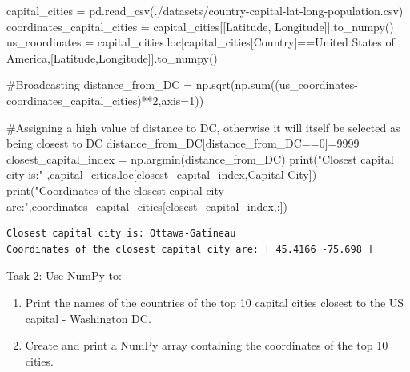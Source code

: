 \documentclass[
  letterpaper,
  DIV=11,
  numbers=noendperiod]{scrreprt}
\newenvironment{Shaded}{\begin{snugshade}}{\end{snugshade}}
\newcommand{\BuiltInTok}[1]{\textcolor[rgb]{0.00,0.23,0.31}{#1}}
\newcommand{\CommentTok}[1]{\textcolor[rgb]{0.37,0.37,0.37}{#1}}
\newcommand{\DecValTok}[1]{\textcolor[rgb]{0.68,0.00,0.00}{#1}}
\newcommand{\NormalTok}[1]{\textcolor[rgb]{0.00,0.23,0.31}{#1}}
\newcommand{\OperatorTok}[1]{\textcolor[rgb]{0.37,0.37,0.37}{#1}}
\newcommand{\StringTok}[1]{\textcolor[rgb]{0.13,0.47,0.30}{#1}}
\begin{document}
\begin{Shaded}
\begin{Highlighting}[]

\NormalTok{capital\_cities }\OperatorTok{=}\NormalTok{ pd.read\_csv(}\StringTok{\textquotesingle{}./datasets/country{-}capital{-}lat{-}long{-}population.csv\textquotesingle{}}\NormalTok{)}
\NormalTok{coordinates\_capital\_cities }\OperatorTok{=}\NormalTok{ capital\_cities[[}\StringTok{\textquotesingle{}Latitude\textquotesingle{}}\NormalTok{, }\StringTok{\textquotesingle{}Longitude\textquotesingle{}}\NormalTok{]].to\_numpy()}
\NormalTok{us\_coordinates }\OperatorTok{=}\NormalTok{ capital\_cities.loc[capital\_cities[}\StringTok{\textquotesingle{}Country\textquotesingle{}}\NormalTok{]}\OperatorTok{==}\StringTok{\textquotesingle{}United States of America\textquotesingle{}}\NormalTok{,[}\StringTok{\textquotesingle{}Latitude\textquotesingle{}}\NormalTok{,}\StringTok{\textquotesingle{}Longitude\textquotesingle{}}\NormalTok{]].to\_numpy()}

\CommentTok{\#Broadcasting}
\NormalTok{distance\_from\_DC }\OperatorTok{=}\NormalTok{ np.sqrt(np.}\BuiltInTok{sum}\NormalTok{((us\_coordinates}\OperatorTok{{-}}\NormalTok{coordinates\_capital\_cities)}\OperatorTok{**}\DecValTok{2}\NormalTok{,axis}\OperatorTok{=}\DecValTok{1}\NormalTok{))}

\CommentTok{\#Assigning a high value of distance to DC, otherwise it will itself be selected as being closest to DC}
\NormalTok{distance\_from\_DC[distance\_from\_DC}\OperatorTok{==}\DecValTok{0}\NormalTok{]}\OperatorTok{=}\DecValTok{9999}
\NormalTok{closest\_capital\_index }\OperatorTok{=}\NormalTok{ np.argmin(distance\_from\_DC)}
\BuiltInTok{print}\NormalTok{(}\StringTok{"Closest capital city is:"}\NormalTok{ ,capital\_cities.loc[closest\_capital\_index,}\StringTok{\textquotesingle{}Capital City\textquotesingle{}}\NormalTok{])}
\BuiltInTok{print}\NormalTok{(}\StringTok{"Coordinates of the closest capital city are:"}\NormalTok{,coordinates\_capital\_cities[closest\_capital\_index,:])}
\end{Highlighting}
\end{Shaded}

\begin{verbatim}
Closest capital city is: Ottawa-Gatineau
Coordinates of the closest capital city are: [ 45.4166 -75.698 ]
\end{verbatim}

Task 2: Use NumPy to:

\begin{enumerate}
\def\labelenumi{\arabic{enumi}.}
\item
  Print the names of the countries of the top 10 capital cities closest
  to the US capital - Washington DC.
\item
  Create and print a NumPy array containing the coordinates of the top
  10 cities.
\end{enumerate}
\end{document}
